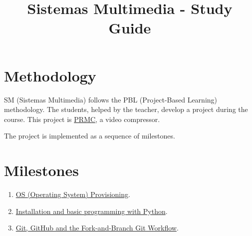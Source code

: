 \title{Sistemas Multimedia - Study Guide}

\maketitle

\section{Methodology}
SM (Sistemas Multimedia) follows the PBL (Project-Based Learning) methodology. The students,
helped by the teacher, develop a project during the course. This
project
is \href{https://github.com/Sistemas-Multimedia/PRMC}{PRMC},
a video compressor.

The project is implemented as a sequence of milestones.

\section{Milestones}
\begin{enumerate}
\item \href{https://sistemas-multimedia.github.io/study_guide/provisioning/}{OS (Operating System) Provisioning}.
\item \href{https://sistemas-multimedia.github.io/study_guide/python/}{Installation and basic programming with Python}.
\item \href{https://sistemas-multimedia.github.io/study_guide/git/}{Git, GitHub and the Fork-and-Branch Git Workflow}.
\end{enumerate}

